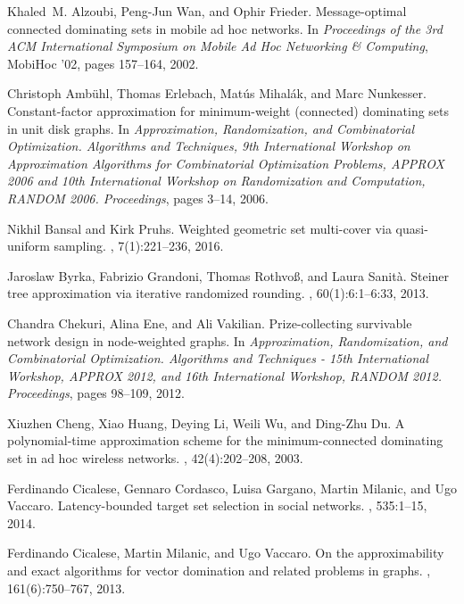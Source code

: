 \documentclass[11pt]{article}
\begin{document}
\begin{thebibliography}{10}

Khaled~M. Alzoubi, Peng-Jun Wan, and Ophir Frieder.
\newblock Message-optimal connected dominating sets in mobile ad hoc networks.
\newblock In {\em Proceedings of the 3rd ACM International Symposium on Mobile
  Ad Hoc Networking \& Computing}, MobiHoc '02, pages 157--164, 2002.

Christoph Amb{\"{u}}hl, Thomas Erlebach, Mat{\'{u}}s Mihal{\'{a}}k, and Marc
  Nunkesser.
\newblock Constant-factor approximation for minimum-weight (connected)
  dominating sets in unit disk graphs.
\newblock In {\em Approximation, Randomization, and Combinatorial Optimization.
  Algorithms and Techniques, 9th International Workshop on Approximation
  Algorithms for Combinatorial Optimization Problems, {APPROX} 2006 and 10th
  International Workshop on Randomization and Computation, {RANDOM} 2006.
  Proceedings}, pages 3--14, 2006.

Nikhil Bansal and Kirk Pruhs.
\newblock Weighted geometric set multi-cover via quasi-uniform sampling.
, 7(1):221--236, 2016.

Jaroslaw Byrka, Fabrizio Grandoni, Thomas Rothvo{\ss}, and Laura Sanit{\`{a}}.
\newblock Steiner tree approximation via iterative randomized rounding.
, 60(1):6:1--6:33, 2013.

Chandra Chekuri, Alina Ene, and Ali Vakilian.
\newblock Prize-collecting survivable network design in node-weighted graphs.
\newblock In {\em Approximation, Randomization, and Combinatorial Optimization.
  Algorithms and Techniques - 15th International Workshop, {APPROX} 2012, and
  16th International Workshop, {RANDOM} 2012. Proceedings}, pages 98--109,
  2012.

Xiuzhen Cheng, Xiao Huang, Deying Li, Weili Wu, and Ding{-}Zhu Du.
\newblock A polynomial-time approximation scheme for the minimum-connected
  dominating set in ad hoc wireless networks.
, 42(4):202--208, 2003.

Ferdinando Cicalese, Gennaro Cordasco, Luisa Gargano, Martin Milanic, and Ugo
  Vaccaro.
\newblock Latency-bounded target set selection in social networks.
, 535:1--15, 2014.

Ferdinando Cicalese, Martin Milanic, and Ugo Vaccaro.
\newblock On the approximability and exact algorithms for vector domination and
  related problems in graphs.
, 161(6):750--767, 2013.


\end{thebibliography}
\end{document}
